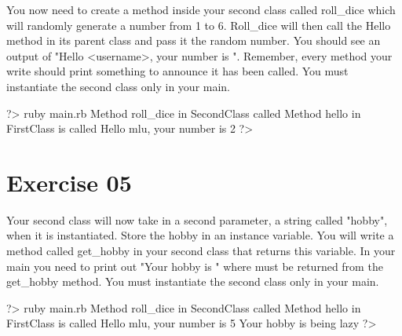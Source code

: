 \documentclass{42-en}
\begin{document}
You now need to create a method inside your second class called roll\_dice which will randomly generate a number from 1 to 6. Roll\_dice will then call the Hello method in its parent class and pass it the random number. You should see an output of "Hello <username>, your number is ". Remember, every method your write should print something to announce it has been called. You must instantiate the second class only in your main.

\begin{42console}
	?> ruby main.rb
	Method roll_dice in SecondClass called
	Method hello in FirstClass is called
	Hello mlu, your number is 2
	?>
\end{42console}

\nextexercice
\chapter{Exercise 05}


\makeheaderfiles

Your second class will now take in a second parameter, a string called "hobby", when it is instantiated. Store the hobby in an instance variable. You will write a method called get\_hobby in your second class that returns this variable. In your main you need to print out "Your hobby is " where must be returned from the get\_hobby method. You must instantiate the second class only in your main.

\begin{42console}
	?> ruby main.rb
	Method roll_dice in SecondClass called
	Method hello in FirstClass is called
	Hello mlu, your number is 5
	Your hobby is being lazy
	?>
\end{42console}



\end{document}
